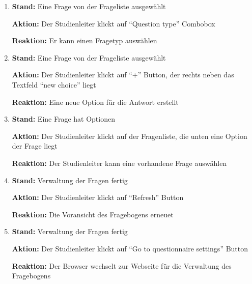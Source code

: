 \documentclass[a4paper]{scrreprt}
\begin{document}
\begin{itemize}
\begin{enumerate}
                        \item \par \textbf{Stand: } Eine Frage von der Frageliste ausgewählt
                              \par \textbf{Aktion: } Der \gls{Studienleiter} klickt auf ``Question type'' Combobox
                              \par \textbf{Reaktion: } Er kann einen Fragetyp auswählen

                        \item \par \textbf{Stand: }  Eine Frage von der Frageliste ausgewählt
                              \par \textbf{Aktion: } Der \gls{Studienleiter} klickt auf ``+'' Button, der rechts neben das Textfeld ``new choice'' liegt
                              \par \textbf{Reaktion: } Eine neue Option für die Antwort erstellt

                        \item \par \textbf{Stand: } Eine Frage hat Optionen
                              \par \textbf{Aktion: } Der \gls{Studienleiter} klickt auf der Fragenliste, die unten eine Option der Frage liegt
                              \par \textbf{Reaktion: }Der \gls{Studienleiter} kann eine vorhandene Frage auswählen

                        \item \par \textbf{Stand: }  Verwaltung der Fragen fertig
                              \par \textbf{Aktion: } Der \gls{Studienleiter} klickt auf ``Refresh'' Button
                              \par \textbf{Reaktion: } Die Voransicht des Fragebogens erneuet

                        \item \par \textbf{Stand: } Verwaltung der Fragen fertig
                              \par \textbf{Aktion: } Der \gls{Studienleiter} klickt auf ``Go to questionnaire settings'' Button
                              \par \textbf{Reaktion: } Der Browser wechselt zur Webseite für die Verwaltung des Fragebogens

                    \end{enumerate}



\end{itemize}
\end{document}
